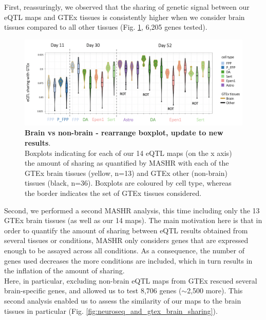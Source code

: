 First, reassuringly, we observed that the sharing of genetic signal between our eQTL maps and GTEx tissues is consistently higher when we consider brain tissues compared to all other tissues (Fig. \ref{fig:neuroseq_and_gtex_brain_specificity}, 6,205 genes tested). 
\\

\begin{figure}[h]
\centering
\includegraphics[width=16cm]{Chapter5/Fig/neuroseq_gtex_brain_nonbrain_boxplots.png}
\caption[Brain vs non-brain]{\textbf{Brain vs non-brain - rearrange boxplot, update to new results}.\\
Boxplots indicating for each of our 14 eQTL maps (on the x axis) the amount of sharing as quantified by MASHR \cite{urbut2019flexible} with each of the GTEx brain tissues (yellow, n=13) and GTEx other (non-brain) tissues (black, n=36).
Boxplots are coloured by cell type, whereas the border indicates the set of GTEx tissues considered.}
\label{fig:neuroseq_and_gtex_brain_specificity}
\end{figure}

\newpage

Second, we performed a second MASHR analysis, this time including only the 13 GTEx brain tissues (as well as our 14 maps).
The main motivation here is that in order to quantify the amount of sharing between eQTL results obtained from several tissues or conditions, MASHR only considers 
genes that are expressed enough to be assayed across all conditions.
As a consequence, the number of genes used decreases the more conditions are included, which in turn results in the inflation of the amount of sharing.\\

Here, in particular, excluding non-brain eQTL maps from GTEx rescued several brain-specific genes, and allowed us to test 8,706 genes ($\sim$2,500 more).
This second analysis enabled us to assess the similarity of our maps to the brain tissues in particular (Fig. \ref{fig:neuroseq_and_gtex_brain_sharing}). \\

